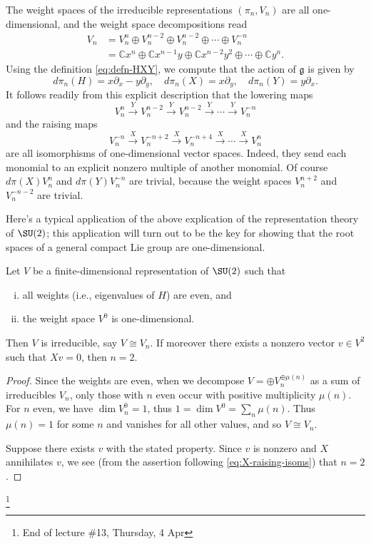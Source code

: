 \documentclass[reqno]{amsart} 
\begin{document}
The weight spaces of the irreducible representations $(\pi_n,V_n)$ are all one-dimensional, and the weight space decompositions read
\begin{align*}
  V_n
  &=
    V_n^{n} \oplus V_n^{n-2} \oplus V_n^{n-2} \oplus \dotsb
    \oplus V_{n}^{-n}
  \\
  &=
    \mathbb{C} x^n
    \oplus \mathbb{C} x^{n-1} y
    \oplus \mathbb{C} x^{n-2} y^2
    \oplus \dotsb \oplus
    \mathbb{C} y^n.
\end{align*}
Using the definition \eqref{eq:defn-HXY}, we compute that the action of $\mathfrak{g}$ is given by
\begin{equation*}
  d \pi_n(H) = x \partial_x - y \partial _y,
  \quad d \pi_n(X)
  = x \partial_y,
  \quad
  d \pi_n(Y) = y \partial_x.
\end{equation*}
It follows readily from this explicit description that the lowering maps
\begin{equation*}
  V_n^n \xrightarrow{Y} V_n^{n-2}
  \xrightarrow{Y} V_n^{n-2} \xrightarrow{Y} \dotsb
  \xrightarrow{Y} V_n^{-n}
\end{equation*}
and the raising maps
\begin{equation}\label{eq:X-raising-isoms}
  V_n^{-n} \xrightarrow{X} V_n^{-n+2}
  \xrightarrow{X} V_n^{-n+4} \xrightarrow{X} \dotsb
  \xrightarrow{X} V_n^{n}
\end{equation}
are all isomorphisms of one-dimensional vector spaces.  Indeed, they send each monomial to an explicit nonzero multiple of another monomial.  Of course $d \pi(X) V_n^n$ and $d \pi(Y) V_n^{-n}$ are trivial, because the weight spaces $V_n^{n+2}$ and $V_n^{-n-2}$ are trivial.

Here's a typical application of the above explication of the representation theory of $\SU(2)$; this application will turn out to be the key for showing that the root spaces of a general compact Lie group are one-dimensional.
\begin{lemma}\label{lem:key-for-root-space-one-dimensional}
  Let $V$ be a finite-dimensional representation of $\SU(2)$ such that
  \begin{enumerate}
[(i)]
  \item all weights (i.e., eigenvalues of $H$) are even, and
  \item the weight space $V^0$ is one-dimensional.
  \end{enumerate}
  Then $V$ is irreducible, say $V \cong V_n$.  If moreover there exists a nonzero vector $v \in V^2$ such that $X v = 0$, then $n = 2$.
\end{lemma}
\begin{proof}
  Since the weights are even, when we decompose $V = \oplus V_n^{\oplus \mu(n)}$ as a sum of irreducibles $V_n$, only those with $n$ even occur with positive multiplicity $\mu(n)$.  For $n$ even, we have $\dim V_n^0 = 1$, thus $1 = \dim V^0 = \sum_n \mu(n)$.  Thus $\mu(n) = 1$ for some $n$ and vanishes for all other values, and so $V \cong V_n$.

  Suppose there exists $v$ with the stated property.  Since $v$ is nonzero and $X$ annihilates $v$, we see (from the assertion following \eqref{eq:X-raising-isoms}) that $n = 2$.
\end{proof}
\footnote{End of lecture \#13, Thursday, 4 Apr}
\end{document}
